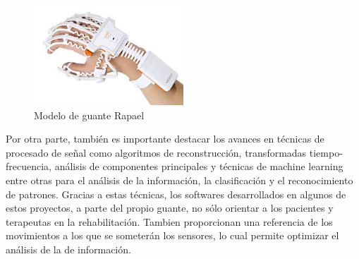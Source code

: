 \begin{figure}[H]
	\centering
	\includegraphics[width=0.5\textwidth]{./img/rapael}
	\caption{Modelo de guante Rapael }
	\label{fig:rapael}
\end{figure} 

 
Por otra parte, también es importante destacar los avances en técnicas de procesado de señal como algoritmos de reconstrucción, transformadas tiempo-frecuencia, análisis de componentes principales y técnicas de machine learning entre otras para el análisis de la información, la clasificación y el reconocimiento de patrones. Gracias a estas técnicas,  los softwares desarrollados en algunos de estos proyectos, a parte del propio guante, no sólo orientar a los pacientes y terapeutas en la rehabilitación. Tambien proporcionan una referencia de los movimientos a los que se someterán los sensores, lo cual permite optimizar el análisis de la de información.





